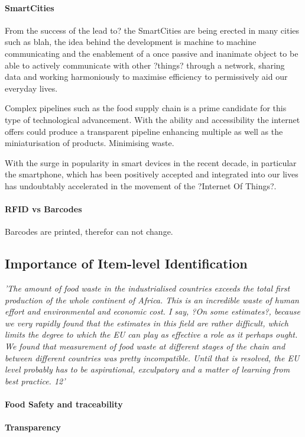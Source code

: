 \documentclass[a4paper, 11pt]{article}
\begin{document}
\paragraph{SmartCities} From the success of the lead to?  the SmartCities are being erected in many cities such as blah, the idea behind the development is machine to machine communicating and the enablement of a once passive and inanimate object to be able to actively communicate with other ?things? through a network, sharing data and working harmoniously to maximise efficiency to permissively aid our everyday lives. 

Complex pipelines such as the food supply chain is a prime candidate for this type of technological advancement. With the ability and accessibility the internet offers could produce a transparent pipeline enhancing multiple as well as the miniaturisation of products. Minimising waste.

With the surge in popularity in smart devices in the recent decade, in particular the smartphone, which has been positively accepted and integrated into our lives has undoubtably accelerated in the movement of the ?Internet Of Things?. 

\paragraph{RFID vs Barcodes}
Barcodes are printed, therefor can not change.

\subsection{Importance of Item-level Identification}
\emph{'The amount of food waste in the industrialised countries exceeds the total first
production of the whole continent of Africa. This is an incredible waste of human effort
and environmental and economic cost. I say, ?On some estimates?, because we very
rapidly found that the estimates in this field are rather difficult, which limits the degree
to which the EU can play as effective a role as it perhaps ought. We found that
measurement of food waste at different stages of the chain and between different
countries was pretty incompatible. Until that is resolved, the EU level probably has to
be aspirational, exculpatory and a matter of learning from best practice. 12'}
\paragraph{Food Safety and traceability}
\paragraph{Transparency}
\end{document}
